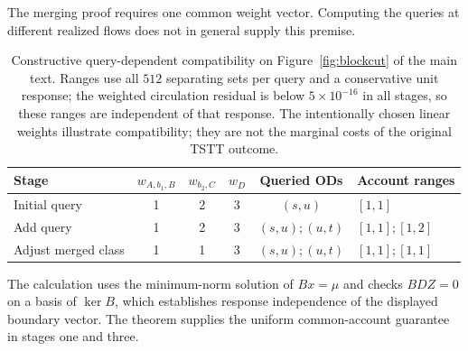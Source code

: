 \begin{rmk}\label{rmk:quantifier}
The merging proof requires one common weight vector. Computing the
queries at different realized flows does not in general supply this
premise.
\end{rmk}

\begin{table}[pos=tb]
\caption{Constructive query-dependent compatibility on Figure~\ref{fig:blockcut}
of the main text. Ranges use all $512$ separating sets per query and a
conservative unit response; the weighted circulation residual is below
$5\times10^{-16}$ in all stages, so these ranges are independent of that
response. The intentionally chosen linear weights illustrate
compatibility; they are not the marginal costs of the original TSTT
outcome.}\label{tab:topologyexample}
\begin{tabular*}{\tblwidth}{@{\extracolsep{\fill}}lccccl}
\toprule Stage & $w_{A,b_1,B}$ & $w_{b_2,C}$ & $w_D$ & Queried ODs & Account ranges\\\midrule
Initial query & 1 & 2 & 3 & $(s,u)$ & $[1,1]$\\
Add query & 1 & 2 & 3 & $(s,u);(u,t)$ & $[1,1];[1,2]$\\
Adjust merged class & 1 & 1 & 3 & $(s,u);(u,t)$ & $[1,1];[1,1]$\\
\bottomrule\end{tabular*}\end{table}
The calculation uses the minimum-norm solution of $Bx=\mu$ and checks
$BDZ=0$ on a basis of $\ker B$, which establishes response independence
of the displayed boundary vector. The theorem supplies the uniform
common-account guarantee in stages one and three.

